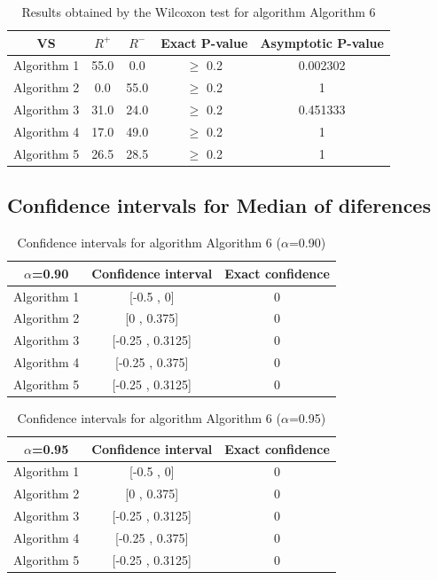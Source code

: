 \documentclass[a4paper,10pt]{article}
\begin{document}
\begin{table}[!htp]
\centering\small
\begin{tabular}{
|c|c|c|c|c|}
\hline
 VS & $R^{+}$ & $R^{-}$ & Exact P-value & Asymptotic P-value \\ \hline 
Algorithm 1 & 55.0 & 0.0 & $\geq$ 0.2 & 0.002302\\ \hline 
Algorithm 2 & 0.0 & 55.0 & $\geq$ 0.2 & 1\\ \hline 
Algorithm 3 & 31.0 & 24.0 & $\geq$ 0.2 & 0.451333\\ \hline 
Algorithm 4 & 17.0 & 49.0 & $\geq$ 0.2 & 1\\ \hline 
Algorithm 5 & 26.5 & 28.5 & $\geq$ 0.2 & 1\\ \hline 

\end{tabular}
\caption{Results obtained by the Wilcoxon test for algorithm Algorithm 6}
\end{table}

\subsection{Confidence intervals for Median of diferences}

\begin{table}[!htp]
\centering\small
\begin{tabular}{
|c|c|c|}
\hline
 $\alpha$=0.90 & Confidence interval & Exact confidence \\ \hline 
Algorithm 1 & [-0.5 , 0] & 0\\ \hline 
Algorithm 2 & [0 , 0.375] & 0\\ \hline 
Algorithm 3 & [-0.25 , 0.3125] & 0\\ \hline 
Algorithm 4 & [-0.25 , 0.375] & 0\\ \hline 
Algorithm 5 & [-0.25 , 0.3125] & 0\\ \hline 

\end{tabular}
\caption{Confidence intervals for algorithm Algorithm 6 ($\alpha$=0.90)}
\end{table}
\begin{table}[!htp]
\centering\small
\begin{tabular}{
|c|c|c|}
\hline
 $\alpha$=0.95 & Confidence interval & Exact confidence \\ \hline 
Algorithm 1 & [-0.5 , 0] & 0\\ \hline 
Algorithm 2 & [0 , 0.375] & 0\\ \hline 
Algorithm 3 & [-0.25 , 0.3125] & 0\\ \hline 
Algorithm 4 & [-0.25 , 0.375] & 0\\ \hline 
Algorithm 5 & [-0.25 , 0.3125] & 0\\ \hline 

\end{tabular}
\caption{Confidence intervals for algorithm Algorithm 6 ($\alpha$=0.95)}
\end{table}

 \clearpage 
\end{document}
